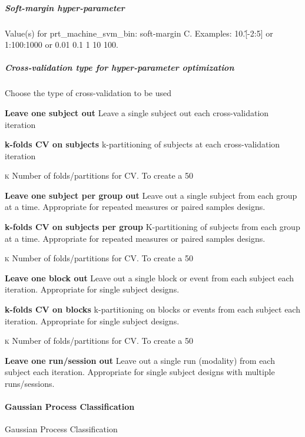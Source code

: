 \subparagraph{Soft-margin hyper-parameter}
Value(s) for prt\_machine\_svm\_bin: soft-margin C. Examples: 10.\^[-2:5] or 1:100:1000 or 0.01 0.1 1 10 100.


\subparagraph{Cross-validation type for hyper-parameter optimization}
Choose the type of cross-validation to be used


\textbf{Leave one subject out}
Leave a single subject out each cross-validation iteration


\textbf{k-folds CV on subjects}
k-partitioning of subjects at each cross-validation iteration


\textsc{k}
Number of folds/partitions for CV. To create a 50%


\textbf{Leave one subject per group out}
Leave out a single subject from each group at a time. Appropriate for repeated measures or paired samples designs.


\textbf{k-folds CV on subjects per group}
K-partitioning of subjects from each group at a time. Appropriate for repeated measures or paired samples designs.


\textsc{k}
Number of folds/partitions for CV. To create a 50%


\textbf{Leave one block out}
Leave out a single block or event from each subject each iteration. Appropriate for single subject designs.


\textbf{k-folds CV on blocks}
k-partitioning on blocks or events from each subject each iteration. Appropriate for single subject designs.


\textsc{k}
Number of folds/partitions for CV. To create a 50%


\textbf{Leave one run/session out}
Leave out a single run (modality) from each subject each iteration. Appropriate for single subject designs with multiple runs/sessions.


\paragraph{Gaussian Process Classification}
Gaussian Process Classification


